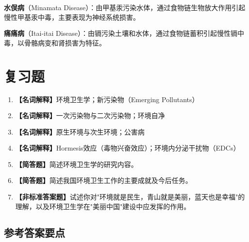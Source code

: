 \documentclass[10pt,a4paper,oneside]{ctexbook}
\begin{document}
\begin{keybox}
\textbf{水俣病}（Minamata Disease）：由甲基汞污染水体，通过食物链生物放大作用引起慢性甲基汞中毒，主要表现为神经系统损害。

\textbf{痛痛病}（Itai-itai Disease）：由镉污染土壤和水体，通过食物链蓄积引起慢性镉中毒，以骨骼病变和肾损害为特征。
\end{keybox}

\section{复习题}

\begin{enumerate}[leftmargin=*, itemsep=8pt]
    \item \textbf{【名词解释】}环境卫生学；新污染物（Emerging Pollutants）
    \item \textbf{【名词解释】}一次污染物与二次污染物；环境自净
    \item \textbf{【名词解释】}原生环境与次生环境；公害病
    \item \textbf{【名词解释】}Hormesis效应（毒物兴奋效应）；环境内分泌干扰物（EDCs）
    \item \textbf{【简答题】}简述环境卫生学的研究内容。
    \item \textbf{【简答题】}简述我国环境卫生工作的主要成就及今后任务。
    \item \textbf{【非标准答案题】}试述你对"环境就是民生，青山就是美丽，蓝天也是幸福"的理解，以及环境卫生学在"美丽中国"建设中应发挥的作用。
\end{enumerate}

\subsection*{参考答案要点}
\end{document}
